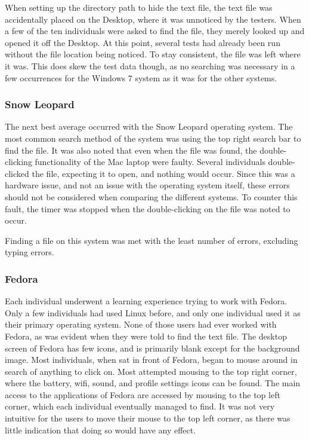 \documentclass[11pt,letterpaper]{report}
\begin{document}
When setting up the directory path to hide the text file, the text file was accidentally placed on the Desktop, where it was unnoticed by the testers. When a few of the ten individuals were asked to find the file, they merely looked up and opened it off the Desktop. At this point, several tests had already been run without the file location being noticed. To stay consistent, the file was left where it was. This does skew the test data though, as no searching was necessary in a few occurrences for the Windows 7 system as it was for the other systems.

\subsubsection{Snow Leopard}
The next best average occurred with the Snow Leopard operating system. The most common search method of the system was using the top right search bar to find the file. It was also noted that even when the file was found, the double-clicking functionality of the Mac laptop were faulty. Several individuals double-clicked the file, expecting it to open, and nothing would occur. Since this was a hardware issue, and not an issue with the operating system itself, these errors should not be considered when comparing the different systems. To counter this fault, the timer was stopped when the double-clicking on the file was noted to occur.

Finding a file on this system was met with the least number of errors, excluding typing errors. 

\subsubsection{Fedora}
Each individual underwent a learning experience trying to work with Fedora. Only a few individuals had used Linux before, and only one individual used it as their primary operating system. None of those users had ever worked with Fedora, as was evident when they were told to find the text file. The desktop screen of Fedora has few icons, and is primarily blank except for the background image. Most individuals, when sat in front of Fedora, began to mouse around in search of anything to click on. Most attempted mousing to the top right corner, where the battery, wifi, sound, and profile settings icons can be found. The main access to the applications of Fedora are accessed by mousing to the top left corner, which each individual eventually managed to find. It was not very intuitive for the users to move their mouse to the top left corner, as there was little indication that doing so would have any effect. 
\end{document}
